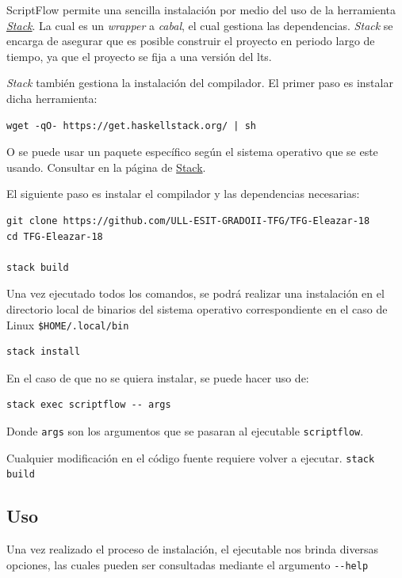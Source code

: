 \documentclass[11pt]{article}
\begin{document}
ScriptFlow permite una sencilla instalación por medio del uso de la herramienta \emph{\href{https://docs.haskellstack.org/en/stable/README/}{Stack}}. La cual es un \emph{wrapper} a \emph{cabal}, el cual gestiona
las dependencias. \emph{Stack} se encarga de asegurar que es posible construir
el proyecto en periodo largo de tiempo, ya que el proyecto se fija a una
versión del \gls{lts}.

\emph{Stack} también gestiona la instalación del compilador. El primer paso es instalar dicha herramienta:
\begin{verbatim}
wget -qO- https://get.haskellstack.org/ | sh
\end{verbatim}
O se puede usar un paquete específico según el sistema operativo que se este usando. Consultar en la página de \href{https://docs.haskellstack.org/en/stable/install\_and\_upgrade/}{Stack}.

El siguiente paso es instalar el compilador y las dependencias necesarias:

\begin{verbatim}
git clone https://github.com/ULL-ESIT-GRADOII-TFG/TFG-Eleazar-18
cd TFG-Eleazar-18

stack build
\end{verbatim}

Una vez ejecutado todos los comandos, se podrá realizar una instalación en el directorio local de binarios del sistema operativo correspondiente
en el caso de Linux \texttt{\$HOME/.local/bin}

\begin{verbatim}
stack install
\end{verbatim}

En el caso de que no se quiera instalar, se puede hacer uso de:
\begin{verbatim}
stack exec scriptflow -- args
\end{verbatim}

Donde \texttt{args} son los argumentos que se pasaran al ejecutable \texttt{scriptflow}.

Cualquier modificación en el código fuente requiere volver a ejecutar. \texttt{stack build}

\subsection{Uso}
\label{sec:org9f89592}

Una vez realizado el proceso de instalación, el ejecutable nos brinda diversas opciones, las cuales pueden
ser consultadas mediante el argumento \texttt{-{}-help}
\end{document}
